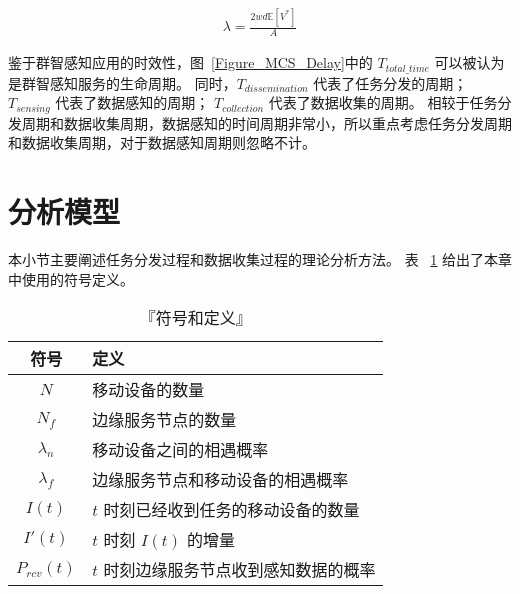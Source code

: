 \begin{equation}
  \label{Formula_EncounterRate}
  \begin{gathered}
  \lambda = \frac{2 w d \mathbb{E}[V^*]}{A}
  \end{gathered}
\end{equation}


鉴于群智感知应用的时效性，图~\ref{Figure_MCS_Delay}中的 $T_{total\_time}$ 可以被认为是群智感知服务的生命周期。
同时，$T_{dissemination}$ 代表了任务分发的周期；
$T_{sensing}$ 代表了数据感知的周期；
$T_{collection}$ 代表了数据收集的周期。
相较于任务分发周期和数据收集周期，数据感知的时间周期非常小，所以重点考虑任务分发周期和数据收集周期，对于数据感知周期则忽略不计。

\section{分析模型}
本小节主要阐述任务分发过程和数据收集过程的理论分析方法。
表 ~\ref{table_notations} 给出了本章中使用的符号定义。

\begin{table}[h]
  \vspace{-1.5em}
  \caption{『符号和定义』}
  \vspace{-0.5em}
  \centering
  \label{table_notations}
  \begin{tabular}{|c|p{7cm}|}
  \hline
  \textbf{符号} & \textbf{定义}\\
  \hline
  $N$ & 移动设备的数量\\\hline
  $N_f$ & 边缘服务节点的数量\\\hline
  $\lambda_n$ & 移动设备之间的相遇概率\\\hline
  $\lambda_f$ & 边缘服务节点和移动设备的相遇概率\\\hline
  $I(t)$ & $t$ 时刻已经收到任务的移动设备的数量\\\hline
  $I'(t)$ & $t$ 时刻 $I(t)$ 的增量\\\hline
  $P_{rcv}(t)$ & $t$ 时刻边缘服务节点收到感知数据的概率\\\hline
  \end{tabular}
  \vspace{-1em}
\end{table}

